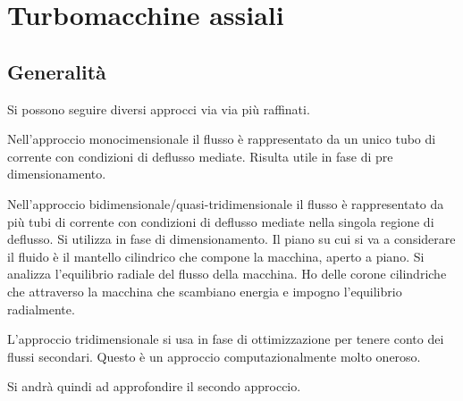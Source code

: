 \chapter{Turbomacchine assiali}

\section{Generalità}
Si possono seguire diversi approcci via via più raffinati.

Nell'approccio monocimensionale il flusso è rappresentato da un unico tubo di corrente con condizioni di deflusso mediate. Risulta utile in fase di pre dimensionamento. 

Nell'approccio bidimensionale/quasi-tridimensionale il flusso è rappresentato da più tubi di corrente con condizioni di deflusso mediate nella singola regione di deflusso. Si utilizza in fase di dimensionamento. Il piano su cui si va a considerare il fluido è il mantello cilindrico che compone la macchina, aperto a piano. Si analizza l'equilibrio radiale del flusso della macchina. Ho delle corone cilindriche che attraverso la macchina che scambiano energia e impogno l'equilibrio radialmente. 

L'approccio tridimensionale si usa in fase di ottimizzazione per tenere conto dei flussi secondari. Questo è un approccio computazionalmente molto oneroso.

Si andrà quindi ad approfondire il secondo approccio.

